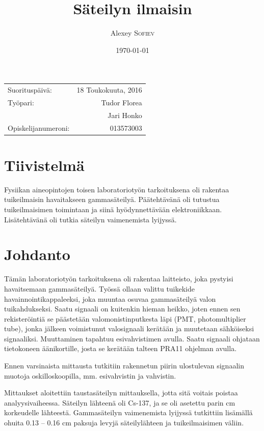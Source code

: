\documentclass[a4paper, 12pt]{article}
\title{Säteilyn ilmaisin} %
\author{Alexey \textsc{Sofiev}} %
\date{\today} %
\begin{document}
\maketitle %

\begin{center}
\begin{tabular}{l r}
Suorituspäivä: & 18 Toukokuuta, 2016 \\ %
Työpari: & Tudor Florea \\ %
& Jari Honko \\
Opiskelijanumeroni: & 013573003 %
\end{tabular}
\end{center}

\clearpage
\section{Tiivistelmä}

Fysiikan aineopintojen toisen laboratoriotyön tarkoituksena oli rakentaa tuikeilmaisin havaitakseen gammasäteilyä. Päätehtävänä oli tutustua tuikeilmaisimen toimintaan ja siinä hyödynnettävään elektroniikkaan. Lisätehtävänä oli tutkia säteilyn vaimenemista lyijyssä.

\clearpage

\section{Johdanto}

Tämän laboratoriotyön tarkoituksena oli rakentaa laitteisto, joka pystyisi havaitsemaan gammasäteilyä. Työssä ollaan valittu tuikekide havainnointikappaleeksi, joka muuntaa osuvaa gammasäteilyä valon tuikahdukseksi. Saatu signaali on kuitenkin hieman heikko, joten ennen sen rekisteröintiä se päästetään valomonistinputkesta läpi (PMT, photomultiplier tube), jonka jälkeen voimistunut valosignaali kerätään ja muutetaan sähköiseksi signaaliksi. Muuttaminen tapahtuu esivahvistimen avulla. Saatu signaali ohjataan tietokoneen äänikortille, josta se kerätään talteen PRA11 ohjelman avulla.

Ennen varsinaista mittausta tutkitiin rakennetun piirin ulostulevan signaalin muotoja oskilloskoopilla, mm. esivahvistin ja vahvistin.

Mittaukset aloitettiin taustasäteilyn mittauksella, jotta sitä voitais poistaa analyysivaiheessa. Säteilyn lähteenä oli Cs-137, ja se oli asetettu parin cm korkeudelle lähteestä. Gammasäteilyn vaimenemista lyijyssä tutkittiin lisämällä ohuita 0.13 -- 0.16 cm paksuja levyjä säteilylähteen ja tuikeilmaisimen väliin.
\end{document}
